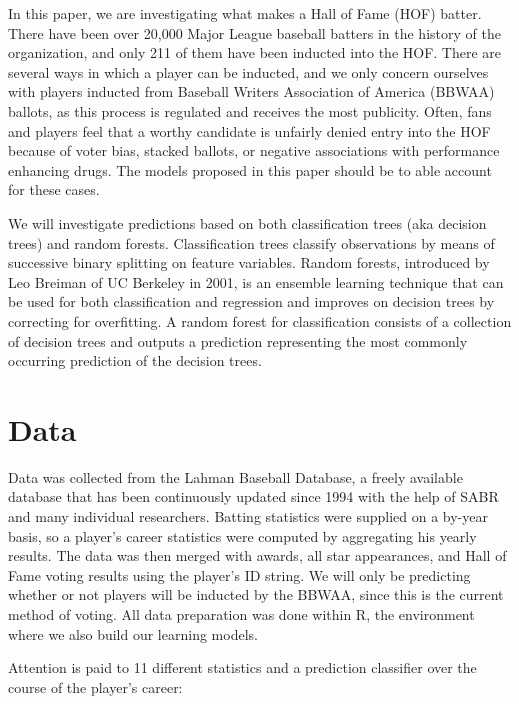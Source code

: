 \documentclass[preprint,12pt]{elsarticle}
\begin{document}
In this paper, we are investigating what makes a Hall of Fame (HOF) batter. There have been over 20,000 Major League baseball batters in the history of the organization, and only 211 of them have been inducted into the HOF. There are several ways in which a player can be inducted, and we only concern ourselves with players inducted from Baseball Writers Association of America (BBWAA) ballots, as this process is regulated and receives the most publicity. Often, fans and players feel that a worthy candidate is unfairly denied entry into the HOF because of voter bias, stacked ballots, or negative associations with performance enhancing drugs. The models proposed in this paper should be to able account for these cases.

We will investigate predictions based on both classification trees (aka decision trees) and random forests. Classification trees classify observations by means of successive binary splitting on feature variables. Random forests, introduced by Leo Breiman of UC Berkeley in 2001, is an ensemble learning technique that can be used for both classification and regression and improves on decision trees by correcting for overfitting. A random forest for classification consists of a collection of decision trees and outputs a prediction representing the most commonly occurring prediction of the decision trees.

\section{Data}
\label{data}
Data was collected from the Lahman Baseball Database, a freely available database that has been continuously updated since 1994 with the help of SABR and many individual researchers. Batting statistics were supplied on a by-year basis, so a player's career statistics were computed by aggregating his yearly results. The data was then merged with awards, all star appearances, and Hall of Fame voting results using the player's ID string. We will only be predicting whether or not players will be inducted by the BBWAA, since this is the current method of voting. All data preparation was done within R, the environment where we also build our learning models. 

Attention is paid to 11 different statistics and a prediction classifier over the course of the player's career:
\end{document}
